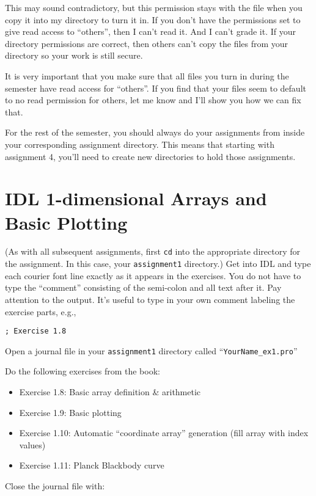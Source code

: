 \documentclass{article}
\begin{document}
\begin{spacing}{1.0}
This may sound contradictory, but this permission stays with the file when you copy it into my directory to turn it in.  If you don’t have the permissions set to give read access to “others”, then I can’t read it.  And I can’t grade it.  If your directory permissions are correct, then others can’t copy the files from your directory so your work is still secure.

It is very important that you make sure that all files you turn in during the semester have read access for “others”.  If you find that your files seem to default to no read permission for others, let me know and I’ll show you how we can fix that.


For the rest of the semester, you should always do your assignments from inside your corresponding assignment directory.  This means that starting with assignment 4, you’ll need to create new directories to hold those assignments.


\section{IDL 1-dimensional Arrays and Basic Plotting}

(As with all subsequent assignments, first \verb|cd| into the appropriate directory
for the assignment.  In this case, your \verb|assignment1| directory.)  Get into IDL
and type each courier font line exactly as it appears in the exercises.  You do
not have to type the “comment” consisting of the semi-colon and all text after
it.  Pay attention to the output.  It’s useful to type in your own comment
labeling the exercise parts, e.g.,

\verb|; Exercise 1.8|

Open a journal file in your \verb|assignment1| directory called “\verb|YourName_ex1.pro|”

Do the following exercises from the book:

\begin{itemize}
    \item Exercise 1.8: Basic array definition & arithmetic
    \item Exercise 1.9: Basic plotting
    \item Exercise 1.10:  Automatic “coordinate array” generation (fill array with index values)
    \item Exercise 1.11:  Planck Blackbody curve
\end{itemize}

Close the journal file with:


\end{spacing}
\end{document}
